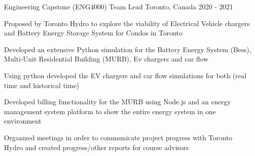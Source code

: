 


\begin{cventries}



\cventry
{Engineering Capstone (ENG4000)} %
{Team Lead} %
{Toronto, Canada} %
{2020 - 2021} %
{ %
\begin{cvitems}
\item {Proposed by Toronto Hydro to explore the viability of Electrical Vehicle chargers and Battery Energy Storage System for Condos in Toronto}
\item {Developed an extensive Python simulation for the Battery Energy System (Bess), Multi-Unit Residential Building (MURB), Ev chargers and car flow}
\item {Using python developed the EV chargers and car flow simulations for both (real time and historical time)}
\item {Developed billing functionality for the MURB using Node.js and an energy management system platform to show the entire energy system in one environment}
\item {Organized meetings in order to communicate project progress with Toronto Hydro and created progress/other reports for course advisors}
\end{cvitems}
}



\end{cventries}